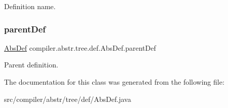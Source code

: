 Definition name. \mbox{\label{classcompiler_1_1abstr_1_1tree_1_1def_1_1_abs_def_ac35f1370ca3666f91a4f10949077f3ba}} 
\subsubsection{\texorpdfstring{parent\+Def}{parentDef}}
{\footnotesize\ttfamily \hyperlink{classcompiler_1_1abstr_1_1tree_1_1def_1_1_abs_def}{Abs\+Def} compiler.\+abstr.\+tree.\+def.\+Abs\+Def.\+parent\+Def\hspace{0.3cm}{\ttfamily [protected]}}

Parent definition. 

The documentation for this class was generated from the following file\+:\begin{DoxyCompactItemize}
\item 
src/compiler/abstr/tree/def/Abs\+Def.\+java\end{DoxyCompactItemize}

